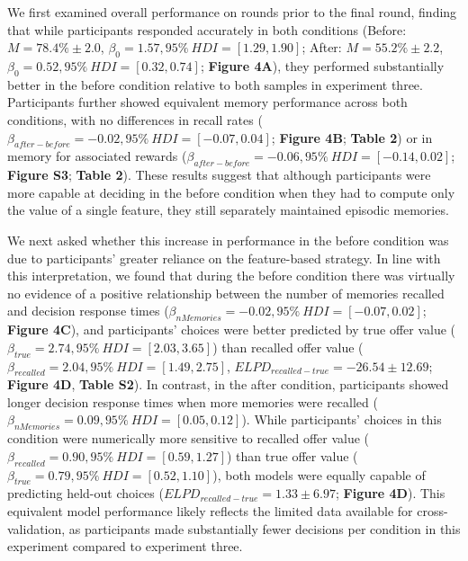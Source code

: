 \documentclass[10pt,letterpaper]{article}
\begin{document}
We first examined overall performance on rounds prior to the final round, finding that while participants responded accurately in both conditions (Before: $M = 78.4\% \pm 2.0$, $\beta_{0} = 1.57, 95\% \ HDI = [1.29, 1.90]$; After: $M = 55.2\% \pm 2.2$, $\beta_{0} = 0.52, 95\% \ HDI = [0.32, 0.74]$; \textbf{Figure 4A}), they performed substantially better in the before condition relative to both samples in experiment three. Participants further showed equivalent memory performance across both conditions, with no differences in recall rates ($\beta_{after-before} = -0.02, 95\% \ HDI = [-0.07, 0.04]$; \textbf{Figure 4B}; \textbf{Table 2}) or in memory for associated rewards ($\beta_{after-before} = -0.06, 95\% \ HDI = [-0.14, 0.02]$; \textbf{Figure S3}; \textbf{Table 2}). These results suggest that although participants were more capable at deciding in the before condition when they had to compute only the value of a single feature, they still separately maintained episodic memories.

We next asked whether this increase in performance in the before condition was due to participants' greater reliance on the feature-based strategy. In line with this interpretation, we found that during the before condition there was virtually no evidence of a positive relationship between the number of memories recalled and decision response times ($\beta_{nMemories} = -0.02, 95\% \ HDI = [-0.07, 0.02]$; \textbf{Figure 4C}), and participants' choices were better predicted by true offer value ($\beta_{true} = 2.74, 95\% \ HDI = [2.03, 3.65]$) than recalled offer value ($\beta_{recalled} = 2.04, 95\% \ HDI = [1.49, 2.75]$, $ELPD_{recalled-true} = -26.54 \pm 12.69$; \textbf{Figure 4D}, \textbf{Table S2}). In contrast, in the after condition, participants showed longer decision response times when more memories were recalled ($\beta_{nMemories} = 0.09, 95\% \ HDI = [0.05, 0.12]$). While participants' choices in this condition were numerically more sensitive to recalled offer value ($\beta_{recalled} = 0.90, 95\% \ HDI = [0.59, 1.27]$) than true offer value ($\beta_{true} = 0.79, 95\% \ HDI = [0.52, 1.10]$), both models were equally capable of predicting held-out choices ($ELPD_{recalled-true} = 1.33 \pm 6.97$; \textbf{Figure 4D}). This equivalent model performance likely reflects the limited data available for cross-validation, as participants made substantially fewer decisions per condition in this experiment compared to experiment three.
\end{document}
